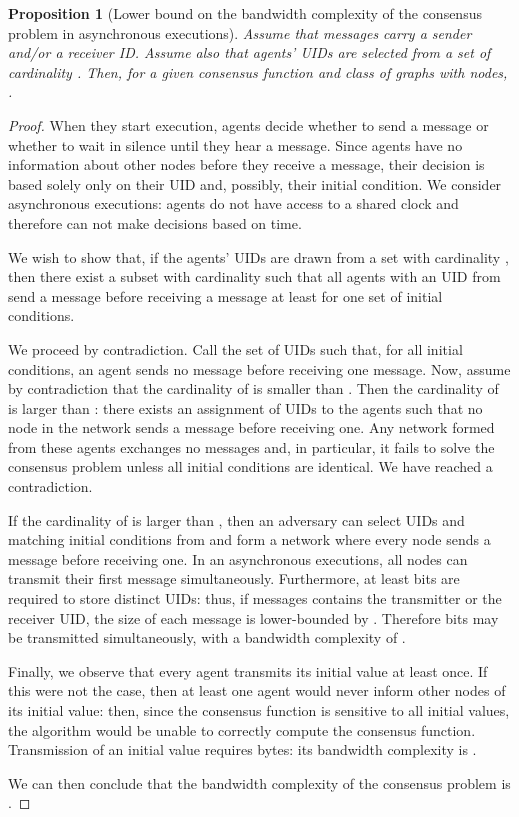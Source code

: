 \documentclass[letterpaper,10pt,conference]{ieeeconf}
\newtheorem{proposition}[theorem]{Proposition}
\begin{document}
\begin{proposition}[Lower bound on the bandwidth complexity of the consensus problem in asynchronous executions]
\label{prop:asynclb}
Assume that messages carry a sender and/or a receiver ID. Assume also that agents' UIDs are selected from a set  of cardinality .  Then, for a given consensus function  and class of graphs  with  nodes,  .
\end{proposition}
\begin{proof}

When they start execution, agents decide whether to send a message or whether to wait in silence until they hear a message. Since agents have no information about other nodes before they receive a message, their decision is based solely only on their UID and, possibly, their initial condition. We consider asynchronous executions: agents do not have access to a shared clock and therefore can not make decisions based on time.

We wish to show that, if the agents' UIDs are drawn from a set  with cardinality , then there exist a subset  with cardinality  such that all agents with an UID from  send a message before receiving a message at least for one set of initial conditions.

We proceed by contradiction. Call  the set of UIDs such that, for all initial conditions, an agent sends no message before receiving one message. Now, assume by contradiction that the cardinality of  is smaller than . Then the cardinality of  is larger than : there exists an assignment of  UIDs to the agents such that no node in the network sends a message before receiving one. Any network formed from these agents exchanges no messages and, in particular, it fails to solve the consensus problem unless all initial conditions are identical. We have reached a contradiction.

If the cardinality of  is larger than , then an adversary can select  UIDs and  matching initial conditions from  and form a network where every node sends a message before receiving one. In an asynchronous executions, all nodes can transmit their first message simultaneously. Furthermore, at least  bits are required to store  distinct UIDs: thus, if messages contains the transmitter or the receiver UID, the size of each message is lower-bounded by . Therefore  bits may be transmitted simultaneously, with a bandwidth complexity of . 

Finally, we observe that every agent transmits its initial value at least once. If this were not the case, then at least one agent would never inform other nodes of its initial value: then, since the consensus function is sensitive to all initial values, the algorithm would be unable to correctly compute the consensus function. Transmission of an initial value requires  bytes: its bandwidth complexity is .

We can then conclude that the bandwidth complexity of the consensus problem is .
 \end{proof}
 
\end{document}
